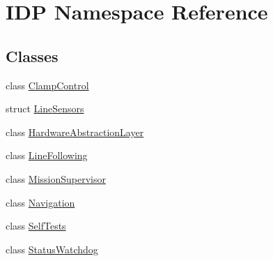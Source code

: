 \hypertarget{namespaceIDP}{
\section{IDP Namespace Reference}
\label{namespaceIDP}
}
\subsection*{Classes}
\begin{DoxyCompactItemize}
\item 
class \hyperlink{classIDP_1_1ClampControl}{ClampControl}
\item 
struct \hyperlink{structIDP_1_1LineSensors}{LineSensors}
\item 
class \hyperlink{classIDP_1_1HardwareAbstractionLayer}{HardwareAbstractionLayer}
\item 
class \hyperlink{classIDP_1_1LineFollowing}{LineFollowing}
\item 
class \hyperlink{classIDP_1_1MissionSupervisor}{MissionSupervisor}
\item 
class \hyperlink{classIDP_1_1Navigation}{Navigation}
\item 
class \hyperlink{classIDP_1_1SelfTests}{SelfTests}
\item 
class \hyperlink{classIDP_1_1StatusWatchdog}{StatusWatchdog}
\end{DoxyCompactItemize}
